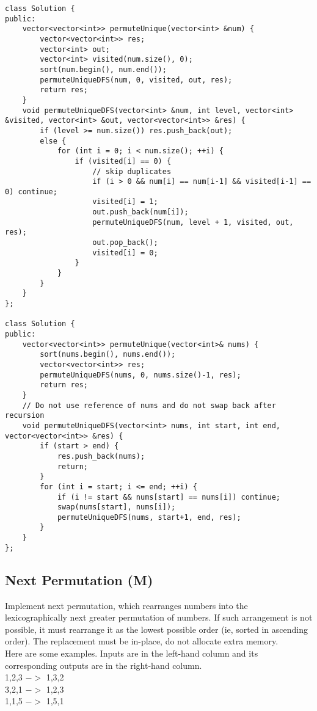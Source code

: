 \begin{lstlisting}
class Solution {
public:
    vector<vector<int>> permuteUnique(vector<int> &num) {
        vector<vector<int>> res;
        vector<int> out;
        vector<int> visited(num.size(), 0);
        sort(num.begin(), num.end());
        permuteUniqueDFS(num, 0, visited, out, res);
        return res;
    }
    void permuteUniqueDFS(vector<int> &num, int level, vector<int> &visited, vector<int> &out, vector<vector<int>> &res) {
        if (level >= num.size()) res.push_back(out);
        else {
            for (int i = 0; i < num.size(); ++i) {
                if (visited[i] == 0) {
                    // skip duplicates
                    if (i > 0 && num[i] == num[i-1] && visited[i-1] == 0) continue;
                    visited[i] = 1;
                    out.push_back(num[i]);
                    permuteUniqueDFS(num, level + 1, visited, out, res);
                    out.pop_back();
                    visited[i] = 0;
                }
            }
        }
    }
};

class Solution {
public:
    vector<vector<int>> permuteUnique(vector<int>& nums) {
        sort(nums.begin(), nums.end());
        vector<vector<int>> res;
        permuteUniqueDFS(nums, 0, nums.size()-1, res);
        return res;
    }
    // Do not use reference of nums and do not swap back after recursion
    void permuteUniqueDFS(vector<int> nums, int start, int end, vector<vector<int>> &res) {
        if (start > end) {
            res.push_back(nums);
            return;
        }
        for (int i = start; i <= end; ++i) {
            if (i != start && nums[start] == nums[i]) continue;
            swap(nums[start], nums[i]);
            permuteUniqueDFS(nums, start+1, end, res);
        }
    }
};
\end{lstlisting}


\subsection{Next Permutation (M)}
Implement next permutation, which rearranges numbers into the lexicographically next greater permutation of numbers. If such arrangement is not possible, it must rearrange it as the lowest possible order (ie, sorted in ascending order). The replacement must be in-place, do not allocate extra memory.\\

Here are some examples. Inputs are in the left-hand column and its corresponding outputs are in the right-hand column.\\
1,2,3 $->$ 1,3,2\\
3,2,1 $->$ 1,2,3\\
1,1,5 $->$ 1,5,1\\

